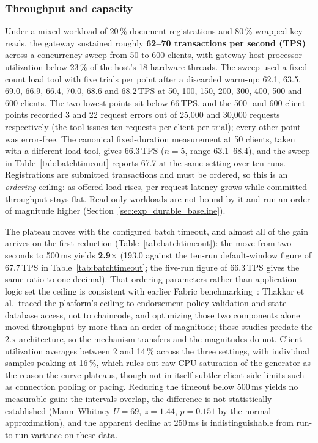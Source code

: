 \documentclass[preprint,12pt]{elsarticle}
\begin{document}
\subsubsection{Throughput and capacity}
\label{sec:exp_throughput}

Under a mixed workload of 20\,\% document registrations and 80\,\% wrapped-key
reads, the gateway sustained roughly \textbf{62--70 transactions per second
(TPS)} across a concurrency sweep from 50 to 600 clients, with gateway-host processor utilization below
23\,\% of the host's 18 hardware threads. The
sweep used a fixed-count load tool with five trials per point after a
discarded warm-up: 62.1, 63.5, 69.0, 66.9, 66.4, 70.0, 68.6 and 68.2\,TPS at
50, 100, 150, 200, 300, 400, 500 and 600 clients. The two lowest points sit
below 66\,TPS, and the 500- and 600-client points recorded 3 and 22 request
errors out of 25{,}000 and 30{,}000 requests respectively (the tool issues ten
requests per client per trial); every other point was error-free. The
canonical fixed-duration measurement at 50 clients, taken with a different
load tool, gives 66.3\,TPS ($n=5$, range 63.1--68.4), and the sweep in
Table~\ref{tab:batchtimeout} reports 67.7 at the same setting over ten runs.
Registrations are submitted transactions and must be ordered, so this is an
\emph{ordering} ceiling: as offered load rises, per-request latency grows while
committed throughput stays flat. Read-only workloads are not bound by it and run
an order of magnitude higher (Section~\ref{sec:exp_durable_baseline}).

The plateau moves with the configured batch timeout, and almost all
of the gain arrives on the first reduction (Table~\ref{tab:batchtimeout}): the move
from two seconds to 500\,ms yields \textbf{2.9$\times$} (193.0 against
the ten-run default-window figure of 67.7\,TPS in
Table~\ref{tab:batchtimeout}; the five-run figure of 66.3\,TPS gives the
same ratio to one decimal). That ordering
parameters rather than application logic set the ceiling is consistent with
earlier Fabric benchmarking~\cite{thakkar2018performance,kuzlu2019performance}:
Thakkar et al.\ traced the platform's ceiling to endorsement-policy validation
and state-database access, not to chaincode, and optimizing those two
components alone moved throughput by more than an order of magnitude; those
studies predate the 2.x architecture, so the mechanism transfers and the
magnitudes do not. Client utilization
averages between 2 and 14\,\% across the three settings, with individual samples peaking at 16\,\%, which rules
out raw CPU saturation of the generator as the reason the curve plateaus,
though not in itself subtler client-side limits such as connection pooling or
pacing. Reducing the timeout below 500\,ms yields no measurable gain: the
intervals overlap, the difference is not statistically established
(Mann--Whitney $U = 69$, $z = 1.44$, $p = 0.151$ by the normal approximation),
and the apparent decline at 250\,ms is indistinguishable from run-to-run
variance on these data.
\end{document}
